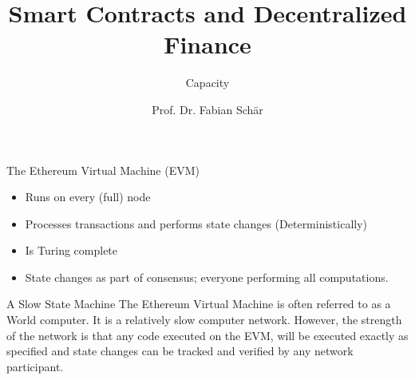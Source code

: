 \documentclass[handout]{beamer}
\title{Smart Contracts and Decentralized Finance}
\subtitle{Capacity}
\author{Prof. Dr. Fabian Schär}
\institute{University of Basel}
\begin{document}
\thispagestyle{empty}
\begin{frame}[noframenumbering]
	\titlepage
\end{frame}


\begin{frame}{The Ethereum Virtual Machine (EVM)}
	\vspace{1em}
\begin{minipage}{0.49\textwidth}
		\begin{tikzpicture}[scale=0.35, every node/.style={scale=0.35}]
		
	\end{tikzpicture}
	\end{minipage}
	\begin{minipage}{0.46\textwidth}
	\begin{small}
		\begin{itemize}
		
			\item<1-> Runs on every (full) node
			\item<2-> Processes transactions and performs state changes (Deterministically)
			\item<3-> Is Turing complete
			\item<4-> State changes as part of consensus; everyone performing all computations.
		\end{itemize}
		\end{small}
	\end{minipage}	
			\vspace{1em}
			
			
\begin{alertblock}{A Slow State Machine}
				The Ethereum Virtual Machine is often referred to as a World computer. It is a relatively slow computer network. However, the strength of the network is that any code executed on the EVM, will be executed exactly as specified and state changes can be tracked and verified by any network participant.
\end{alertblock}				
			
	
\end{frame}
\end{document}
